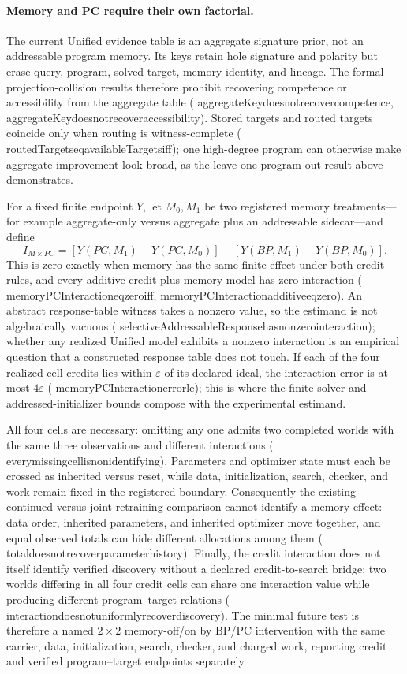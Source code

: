 \documentclass[11pt]{article}
\newcommand{\leanname}[1]{{\scriptsize\ttfamily
  \def\_{\textunderscore\allowbreak}#1}}
\begin{document}
\paragraph{Memory and PC require their own factorial.}
The current Unified evidence table is an aggregate signature prior, not an addressable
program memory.  Its keys retain hole signature and polarity but erase query, program,
solved target, memory identity, and lineage.  The formal projection-collision results
therefore prohibit recovering competence or accessibility from the aggregate table
(\leanname{aggregateKey\_does\_not\_recover\_competence},
\leanname{aggregateKey\_does\_not\_recover\_accessibility}).  Stored targets and routed
targets coincide only when routing is witness-complete
(\leanname{routedTargets\_eq\_availableTargets\_iff}); one high-degree program can
otherwise make aggregate improvement look broad, as the leave-one-program-out result
above demonstrates.

For a fixed finite endpoint $Y$, let $M_0,M_1$ be two registered memory treatments---for
example aggregate-only versus aggregate plus an addressable sidecar---and define
\[
 I_{M\times PC}=
 [Y(PC,M_1)-Y(PC,M_0)]-[Y(BP,M_1)-Y(BP,M_0)].
\]
This is zero exactly when memory has the same finite effect under both credit rules, and
every additive credit-plus-memory model has zero interaction
(\leanname{memoryPCInteraction\_eq\_zero\_iff},
\leanname{memoryPCInteraction\_additive\_eq\_zero}).  An abstract response-table witness
takes a nonzero value, so the estimand is not algebraically vacuous
(\leanname{selectiveAddressableResponse\_has\_nonzero\_interaction}); whether any realized
Unified model exhibits a nonzero interaction is an empirical question that a constructed
response table does not touch.  If each of the
four realized cell credits lies within $\varepsilon$ of its declared ideal, the
interaction error is at most $4\varepsilon$
(\leanname{memoryPCInteraction\_error\_le}); this is where the finite solver and
addressed-initializer bounds compose with the experimental estimand.

All four cells are necessary: omitting any one admits two completed worlds with the same
three observations and different interactions
(\leanname{every\_missing\_cell\_is\_nonidentifying}).  Parameters and optimizer state
must each be crossed as inherited versus reset, while data, initialization, search,
checker, and work remain fixed in the registered boundary.  Consequently the existing
continued-versus-joint-retraining comparison cannot identify a memory effect: data
order, inherited parameters, and inherited optimizer move together, and equal observed
totals can hide different allocations among them
(\leanname{total\_does\_not\_recover\_parameter\_history}).  Finally, the credit
interaction does not itself identify verified discovery without a declared
credit-to-search bridge: two worlds differing in all four credit cells can share one
interaction value while producing different program--target relations
(\leanname{interaction\_does\_not\_uniformly\_recover\_discovery}).  The minimal future test
is therefore a named $2\times2$ memory-off/on by BP/PC intervention with the same
carrier, data, initialization, search, checker, and charged work, reporting credit and
verified program--target endpoints separately.
\end{document}
